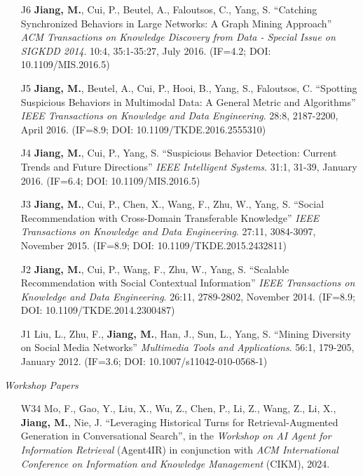 \documentclass[10pt]{article}
\newenvironment{myindentpar}[1]%
{\begin{list}{}%
         {\setlength{\leftmargin}{#1}}%
         \item[]%
}
{\end{list}}
\newcounter{list}
\begin{document}
\begin{myindentpar}{0.00cm}
\begin{enumerate}[leftmargin=.5cm]
\item[J6] \textbf{Jiang, M.}, Cui, P., Beutel, A., Faloutsos, C., Yang, S. ``Catching Synchronized Behaviors in Large Networks: A Graph Mining Approach'' \textit{ACM Transactions on Knowledge Discovery from Data - Special Issue on SIGKDD 2014}. 10:4, 35:1-35:27, July 2016. (IF=4.2; DOI: 10.1109/MIS.2016.5)

\item[J5] \textbf{Jiang, M.}, Beutel, A., Cui, P., Hooi, B., Yang, S., Faloutsos, C. ``Spotting Suspicious Behaviors in Multimodal Data: A General Metric and Algorithms'' \textit{IEEE Transactions on Knowledge and Data Engineering}. 28:8, 2187-2200, April 2016. (IF=8.9; DOI: 10.1109/TKDE.2016.2555310)

\item[J4] \textbf{Jiang, M.}, Cui, P., Yang, S. ``Suspicious Behavior Detection: Current Trends and Future Directions'' \textit{IEEE Intelligent Systems}. 31:1, 31-39, January 2016. (IF=6.4; DOI: 10.1109/MIS.2016.5)

\item[J3] \textbf{Jiang, M.}, Cui, P., Chen, X., Wang, F., Zhu, W., Yang, S. ``Social Recommendation with Cross-Domain Transferable Knowledge'' \textit{IEEE Transactions on Knowledge and Data Engineering}. 27:11, 3084-3097, November 2015. (IF=8.9; DOI: 10.1109/TKDE.2015.2432811)

\item[J2] \textbf{Jiang, M.}, Cui, P., Wang, F., Zhu, W., Yang, S. ``Scalable Recommendation with Social Contextual Information'' \textit{IEEE Transactions on Knowledge and Data Engineering}. 26:11, 2789-2802, November 2014. (IF=8.9; DOI: 10.1109/TKDE.2014.2300487)

\item[J1] Liu, L., Zhu, F., \textbf{Jiang, M.}, Han, J., Sun, L., Yang, S. ``Mining Diversity on Social Media Networks'' \textit{Multimedia Tools and Applications}. 56:1, 179-205, January 2012. (IF=3.6; DOI: 10.1007/s11042-010-0568-1)

\end{enumerate}

\hspace{-0.25cm}\textit{Workshop Papers}

\begin{enumerate}[leftmargin=.5cm]

\item[W34] Mo, F., Gao, Y., Liu, X., Wu, Z., Chen, P., Li, Z., Wang, Z., Li, X., \textbf{Jiang, M.}, Nie, J. ``Leveraging Historical Turns for Retrieval-Augmented Generation in Conversational Search'', in the \textit{Workshop on AI Agent for Information Retrieval} (Agent4IR) in conjunction with \textit{ACM International Conference on Information and Knowledge Management} (CIKM), 2024.
		

\end{enumerate}
\end{myindentpar}
\end{document}
